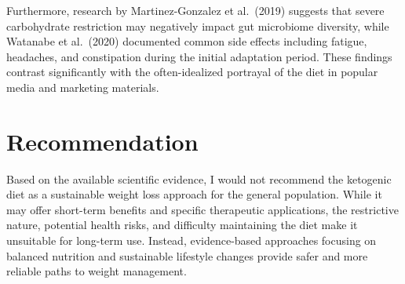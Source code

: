 \documentclass[12pt]{article}
\begin{document}
Furthermore, research by Martinez-Gonzalez et al.\ (2019) suggests that severe carbohydrate restriction may negatively impact gut microbiome diversity, while Watanabe et al.\ (2020) documented common side effects including fatigue, headaches, and constipation during the initial adaptation period. These findings contrast significantly with the often-idealized portrayal of the diet in popular media and marketing materials.

\vspace{-2em}\section*{Recommendation}\vspace{-1em}
Based on the available scientific evidence, I would not recommend the ketogenic diet as a sustainable weight loss approach for the general population. While it may offer short-term benefits and specific therapeutic applications, the restrictive nature, potential health risks, and difficulty maintaining the diet make it unsuitable for long-term use. Instead, evidence-based approaches focusing on balanced nutrition and sustainable lifestyle changes provide safer and more reliable paths to weight management.\vspace{-2em}
\end{document}
